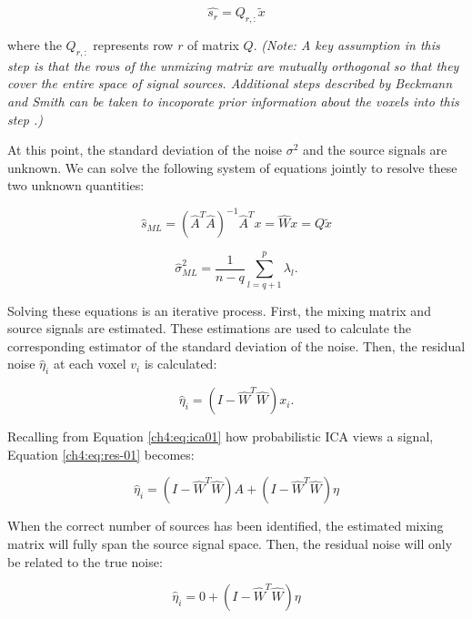 \begin{equation}
\hat{s_r} = Q_{r,:} \tilde{x}
\end{equation}

\noindent where the $Q_{r, :}$ represents row $r$ of matrix $Q$.  \textit{(Note: A key assumption in this step is that the rows of the unmixing matrix are mutually orthogonal so that they cover the entire space of signal sources. Additional steps described by Beckmann and Smith can be taken to incoporate prior information about the voxels into this step \cite{Beckmann2004}.)}

At this point, the standard deviation of the noise $\sigma^2$ and the source signals are unknown. We can solve the following system of equations jointly to resolve these two unknown quantities:

\begin{equation}
\hat{s}_{ML} = (\hat{A}^T\hat{A})^{-1}\hat{A}^Tx = \hat{W}x = Q \tilde{x}
\end{equation}

\begin{equation}
\hat{\sigma}_{ML}^2 = \frac{1}{n-q} \sum_{l=q+1}^p \lambda_l .
\end{equation}

Solving these equations is an iterative process. First, the mixing matrix and source signals are estimated. These estimations are used to calculate the corresponding estimator of the standard deviation of the noise. Then, the residual noise $\hat{\eta}_i$ at each voxel $v_i$ is calculated:

\begin{equation}
\label{ch4:eq:res-01}
\hat{\eta}_i = (I - \hat{W}^T\hat{W}) x_i.
\end{equation}

\noindent Recalling from Equation \ref{ch4:eq:ica01} how probabilistic ICA views a signal, Equation \ref{ch4:eq:res-01} becomes: 

\begin{equation}
\hat{\eta}_i = (I - \hat{W}^T\hat{W}) A + (I - \hat{W}^T\hat{W}) \eta
\end{equation}

When the correct number of sources has been identified, the estimated mixing matrix will fully span the source signal space. Then, the residual noise will only be related to the true noise:

\begin{equation}
\hat{\eta}_i = 0 + (I - \hat{W}^T\hat{W}) \eta
\end{equation}

